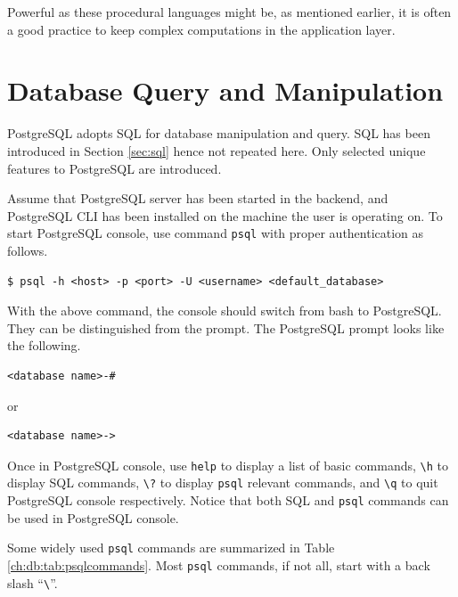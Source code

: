 Powerful as these procedural languages might be, as mentioned earlier, it is often a good practice to keep complex computations in the application layer.

\section{Database Query and Manipulation}

PostgreSQL adopts SQL for database manipulation and query. SQL has been introduced in Section \ref{sec:sql} hence not repeated here. Only selected unique features to PostgreSQL are introduced.

Assume that PostgreSQL server has been started in the backend, and PostgreSQL CLI has been installed on the machine the user is operating on. To start PostgreSQL console, use command \verb|psql| with proper authentication as follows.
\begin{lstlisting}
$ psql -h <host> -p <port> -U <username> <default_database>
\end{lstlisting}
With the above command, the console should switch from bash to PostgreSQL. They can be distinguished from the prompt. The PostgreSQL prompt looks like the following.
\begin{lstlisting}
<database name>-#
\end{lstlisting}
or
\begin{lstlisting}
<database name>->
\end{lstlisting}

Once in PostgreSQL console, use \verb|help| to display a list of basic commands, \verb|\h| to display SQL commands, \verb|\?| to display \verb|psql| relevant commands, and \verb|\q| to quit PostgreSQL console respectively. Notice that both SQL and \verb|psql| commands can be used in PostgreSQL console.

Some widely used \verb|psql| commands are summarized in Table \ref{ch:db:tab:psqlcommands}. Most \verb|psql| commands, if not all, start with a back slash ``\verb|\|''.

